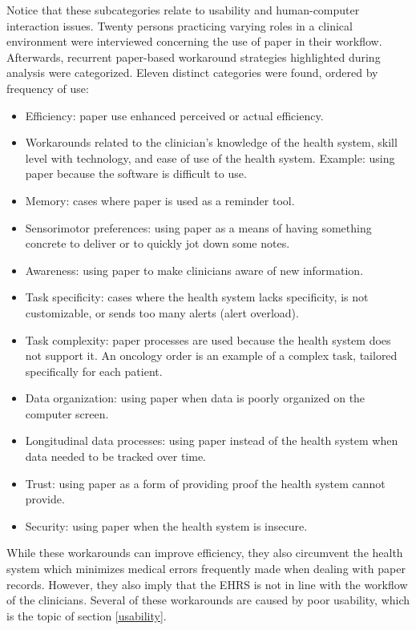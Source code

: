     \noindent Notice that these subcategories relate to usability and human-computer interaction issues. Twenty persons practicing varying roles in a clinical environment were interviewed concerning the use of paper in their workflow. Afterwards, recurrent paper-based workaround strategies highlighted during analysis were categorized. Eleven distinct categories were found, ordered by frequency of use:
    \begin{itemize}
        \item Efficiency: paper use enhanced perceived or actual efficiency.
        \item Workarounds related to the clinician's knowledge of the health system, skill level with technology, and ease of use of the health system. Example: using paper because the software is difficult to use.
        \item Memory: cases where paper is used as a reminder tool.
        \item Sensorimotor preferences: using paper as a means of having something concrete to deliver or to quickly jot down some notes.
        \item Awareness: using paper to make clinicians aware of new information.
        \item Task specificity: cases where the health system lacks specificity, is not customizable, or sends too many alerts (alert overload).
        \item Task complexity: paper processes are used because the health system does not support it. An oncology order is an example of a complex task, tailored specifically for each patient.
        \item Data organization: using paper when data is poorly organized on the computer screen.
        \item Longitudinal data processes: using paper instead of the health system when data needed to be tracked over time.
        \item Trust: using paper as a form of providing proof the health system cannot provide.
        \item Security: using paper when the health system is insecure.
    \end{itemize}

    \noindent While these workarounds can improve efficiency, they also circumvent the health system which minimizes medical errors frequently made when dealing with paper records. However, they also imply that the EHRS is not in line with the workflow of the clinicians. Several of these workarounds are caused by poor usability, which is the topic of section \ref{usability}. %

